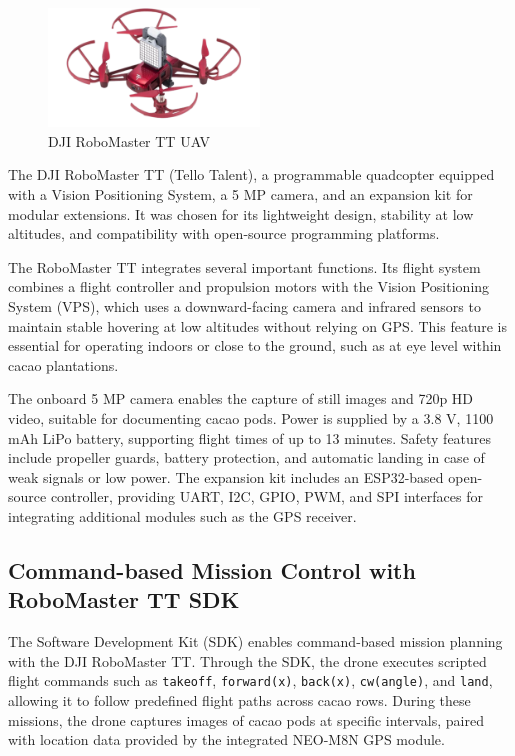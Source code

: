 \begin{figure}[H]
	\centering
	\caption{DJI RoboMaster TT UAV}
	\label{fig:robomaster_tt}
	\includegraphics[width=0.5\textwidth]{figures/Robomaster_TT.pdf}
\end{figure}


The DJI RoboMaster TT (Tello Talent), a programmable quadcopter
equipped with a Vision Positioning System, a 5 MP camera, and an expansion kit for modular extensions.
It was chosen for its lightweight design, stability at low altitudes, and compatibility with open-source
programming platforms.

The RoboMaster TT integrates several important functions. Its flight system combines a flight controller and propulsion motors with the Vision Positioning System (VPS), which uses a downward-facing camera and infrared sensors to maintain stable hovering at low altitudes without relying on GPS. This feature is essential for operating indoors or close to the ground, such as at eye level within cacao plantations.

The onboard 5 MP camera enables the capture of still images and 720p HD video, suitable for documenting cacao pods. Power is supplied by a 3.8 V, 1100 mAh LiPo battery, supporting flight times of up to
13 minutes. Safety features include propeller guards, battery protection, and automatic landing in case of weak signals or low power. The expansion kit includes an ESP32-based open-source controller, providing UART, I2C, GPIO, PWM, and SPI interfaces for integrating additional modules such as the GPS receiver.

\subsection*{Command-based Mission Control with RoboMaster TT SDK}
The Software Development Kit (SDK) enables command-based mission planning with the DJI RoboMaster TT. Through the SDK, the drone executes scripted flight commands such as \texttt{takeoff}, \texttt{forward(x)}, \texttt{back(x)}, \texttt{cw(angle)}, and \texttt{land}, allowing it to follow predefined flight paths across cacao rows. During these missions, the drone captures images of cacao pods at specific intervals, paired with location data provided by the integrated NEO-M8N GPS module.

